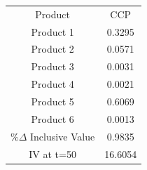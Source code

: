 \begin{tabular}{cc}
Product & CCP \\
Product 1 & 0.3295 \\
Product 2 & 0.0571 \\
Product 3 & 0.0031 \\
Product 4 & 0.0021 \\
Product 5 & 0.6069 \\
Product 6 & 0.0013 \\
$\%\Delta$ Inclusive Value & 0.9835 \\
IV at t=50 & 16.6054 \\
\end{tabular}